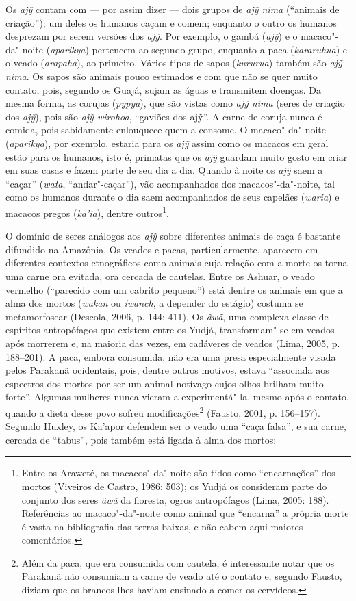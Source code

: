 Os \emph{ajỹ} contam com --- por assim dizer --- dois grupos de \emph{ajỹ
nima} (``animais de criação''); um deles os humanos caçam e comem;
enquanto o outro os humanos desprezam por serem versões dos \emph{ajỹ}.
Por exemplo, o gambá (\emph{ajỹ}) e o macaco"-da"-noite (\emph{aparikya})
pertencem ao segundo grupo, enquanto a paca (\emph{kararuhua}) e o veado
(\emph{arapaha}), ao primeiro. Vários tipos de sapos (\emph{kururua})
também são \emph{ajỹ nima}. Os sapos são animais pouco estimados e com
que não se quer muito contato, pois, segundo os Guajá, sujam as águas e
transmitem doenças. Da mesma forma, as corujas (\emph{pypya}), que são
vistas como \emph{ajỹ nima} (seres de criação dos \emph{ajỹ}), pois são
\emph{ajỹ wirohoa}, ``gaviões dos ajỹ''. A carne de coruja nunca é comida,
pois sabidamente enlouquece quem a consome. O macaco"-da"-noite
(\emph{aparikya}), por exemplo, estaria para os \emph{ajỹ} assim como os
macacos em geral estão para os humanos, isto é, primatas que os
\emph{ajỹ} guardam muito gosto em criar em suas casas e fazem parte de
seu dia a dia. Quando à noite os \emph{ajỹ} saem a ``caçar'' (\emph{wata},
``andar"-caçar''), vão acompanhados dos macacos"-da"-noite, tal como os
humanos durante o dia saem acompanhados de seus capelães (\emph{waria})
e macacos pregos (\emph{ka'ia}), dentre outros\footnote{Entre os
  Araweté, os macacos"-da"-noite são tidos como ``encarnações'' dos mortos
  (Viveiros de Castro, 1986: 503); os Yudjá os consideram parte do
  conjunto dos seres \emph{ãwã} da floresta, ogros antropófagos (Lima,
  2005: 188). Referências ao macaco"-da"-noite como animal que ``encarna'' a
  própria morte é vasta na bibliografia das terras baixas, e não cabem
  aqui maiores comentários.}.

O domínio de seres análogos aos \emph{ajỹ} sobre diferentes animais de
caça é bastante difundido na Amazônia. Os veados e pacas,
particularmente, aparecem em diferentes contextos etnográficos como
animais cuja relação com a morte os torna uma carne ora evitada, ora
cercada de cautelas. Entre os Ashuar, o veado vermelho (``parecido com um
cabrito pequeno'') está dentre os animais em que a alma dos mortos
(\emph{wakan} ou \emph{iwanch}, a depender do estágio) costuma se
metamorfosear (Descola, 2006, p. 144; 411). Os \emph{ãwã}, uma complexa
classe de espíritos antropófagos que existem entre os Yudjá,
transformam"-se em veados após morrerem e, na maioria das vezes, em
cadáveres de veados (Lima, 2005, p. 188--201). A paca, embora consumida,
não era uma presa especialmente visada pelos Parakanã ocidentais, pois,
dentre outros motivos, estava ``associada aos espectros dos mortos por
ser um animal notívago cujos olhos brilham muito forte''. Algumas
mulheres nunca vieram a experimentá"-la, mesmo após o contato, quando a
dieta desse povo sofreu modificações\footnote{Além da paca, que era
  consumida com cautela, é interessante notar que os Parakanã não
  consumiam a carne de veado até o contato e, segundo Fausto, diziam que
  os brancos lhes haviam ensinado a comer os cervídeos.} (Fausto, 2001,
p. 156--157). Segundo Huxley, os Ka'apor defendem ser o veado uma ``caça
falsa'', e sua carne, cercada de ``tabus'', pois também está ligada à alma
dos mortos:

